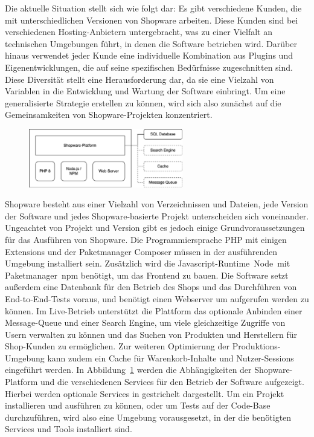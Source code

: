 Die aktuelle Situation stellt sich wie folgt dar: Es gibt verschiedene Kunden, die mit unterschiedlichen Versionen von
Shopware arbeiten.
Diese Kunden sind bei verschiedenen Hosting-Anbietern untergebracht, was zu einer Vielfalt an technischen Umgebungen
führt, in denen die Software betrieben wird.
Darüber hinaus verwendet jeder Kunde eine individuelle Kombination aus Plugins und Eigenentwicklungen, die auf seine
spezifischen Bedürfnisse zugeschnitten sind.
Diese Diversität stellt eine Herausforderung dar, da sie eine Vielzahl von Variablen in die Entwicklung und Wartung der
Software einbringt.
Um eine generalisierte Strategie erstellen zu können, wird sich also zunächst auf die Gemeinsamkeiten von
Shopware-Projekten konzentriert.
\begin{figure}[H]
    \centering
    \includegraphics[width=0.6\textwidth]{images/content/shopware-requirements}
    \label{fig:shopware-requirements}
\end{figure}
Shopware besteht aus einer Vielzahl von Verzeichnissen und Dateien, jede Version der Software und jedes
Shopware-basierte Projekt unterscheiden sich voneinander.
Ungeachtet von Projekt und Version gibt es jedoch einige Grundvoraussetzungen für das Ausführen von Shopware.
Die Programmiersprache PHP mit einigen Extensions und der Paketmanager Composer müssen in der ausführenden Umgebung
installiert sein.
Zusätzlich wird die Javascript-Runtime\ \glqq Node\grqq\ mit Paketmanager\ \acrshort{npm} benötigt, um das Frontend zu
bauen.
Die Software setzt außerdem eine Datenbank für den Betrieb des Shops und das Durchführen von End-to-End-Tests voraus,
und benötigt einen Webserver um aufgerufen werden zu können.
Im Live-Betrieb unterstützt die Plattform das optionale Anbinden einer Message-Queue und einer Search Engine, um viele
gleichzeitige Zugriffe von Usern verwalten zu können und das Suchen von Produkten und Herstellern für Shop-Kunden zu
ermöglichen.
Zur weiteren Optimierung der Produktions-Umgebung kann zudem ein Cache für Warenkorb-Inhalte und Nutzer-Sessions
eingeführt werden.
In Abbildung\ \ref{fig:shopware-requirements} werden die Abhängigkeiten der Shopware-Platform und die verschiedenen
Services für den Betrieb der Software aufgezeigt.
Hierbei werden optionale Services in gestrichelt dargestellt.
Um ein Projekt installieren und ausführen zu können, oder um Tests auf der Code-Base durchzuführen, wird also eine
Umgebung vorausgesetzt, in der die benötigten Services und Tools installiert sind.

